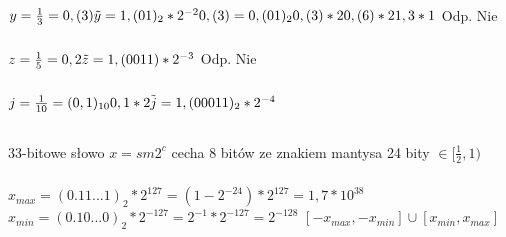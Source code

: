 \documentclass{article}
\begin{document}
    \subsubsection{}
    \begin{math}
        y=\frac{1}{3}=0,(3)\\
        \tilde{y}=1,(01)_{2}*2^{-2}\\
        0,(3)=0,(01)_{2}\\
        0,(3)*2\\
        0,(6)*2\\
        1,3*1
    \end{math}
    Odp. Nie

    \subsubsection{}
    \begin{math}
        z=\frac{1}{5}=0,2\\
        \tilde{z}=1,(0011)*2^{-3}
    \end{math}
    Odp. Nie

    \subsubsection{}
    \begin{math}
        j=\frac{1}{10}=(0,1)_{10}\\
        0,1*2\\
        \tilde{j}=1,(00011)_{2}*2^{-4}
    \end{math}
    
    \subsection{}
    33-bitowe słowo $x=sm2^{c}$\newline
    cecha 8 bitów ze znakiem\newline
    mantysa 24 bity $\in [\frac{1}{2},1)$\newline
    
    \subsubsection{}
    $x_{max}=(0.11...1)_{2}*2^{127}=(1-2^{-24})*2^{127}=1,7*10^{38}$\newline
    $x_{min}=(0.10...0)_{2}*2^{-127}=2^{-1}*2^{-127}=2^{-128}$\newline
    $[-x_{max},-x_{min}]\cup[x_{min},x_{max}]$\newline
    
\end{document}

